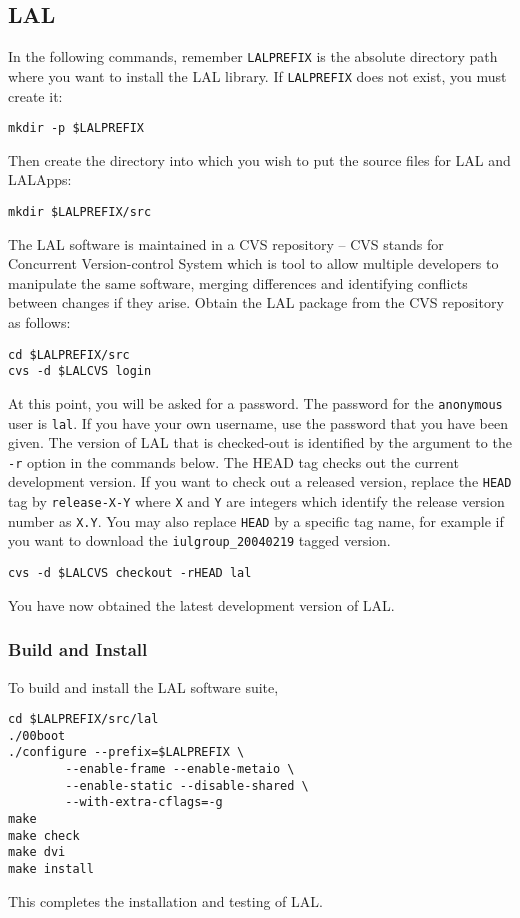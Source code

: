 \subsection{LAL}\label{ss:lal}
\color{black}

In the following commands, remember \verb+LALPREFIX+ is the
absolute directory path where you want to install the LAL library.  If
\verb+LALPREFIX+ does not exist,  you must create it:
\begin{verbatim}
mkdir -p $LALPREFIX
\end{verbatim}
Then create the directory into which you wish to put the source files for LAL
and LALApps:
\begin{verbatim}
mkdir $LALPREFIX/src
\end{verbatim}

The LAL software is maintained in a CVS repository -- CVS stands for
Concurrent Version-control System which is tool to allow multiple developers
to manipulate the same software,  merging differences and identifying
conflicts between changes if they arise.  Obtain the LAL package from the CVS
repository as follows:  
\begin{verbatim}
cd $LALPREFIX/src
cvs -d $LALCVS login
\end{verbatim}
At this point,  you will be asked for a password.  The password for the
\verb+anonymous+ user is \verb+lal+. If you have your own username, use the
password that you have been given.
The version of LAL that is checked-out is identified by the argument
to the \texttt{-r} option in the commands below.   The HEAD tag checks out the
current development version.  If you want to check out a released
version, replace the \verb+HEAD+ tag by \verb+release-X-Y+ where
\verb+X+ and \verb+Y+ are integers which identify the release version
number as \verb+X.Y+. You may also replace \verb+HEAD+ by a specific tag name,
for example if you want to download the \verb+iulgroup_20040219+ tagged
version.
\begin{verbatim}
cvs -d $LALCVS checkout -rHEAD lal
\end{verbatim}
You have now obtained the latest development version of LAL.

\subsubsection{Build and Install}
To build and install the LAL software suite, 
\begin{verbatim}
cd $LALPREFIX/src/lal
./00boot
./configure --prefix=$LALPREFIX \
        --enable-frame --enable-metaio \
        --enable-static --disable-shared \
        --with-extra-cflags=-g
make
make check
make dvi
make install
\end{verbatim}
This completes the installation and testing of LAL.  

